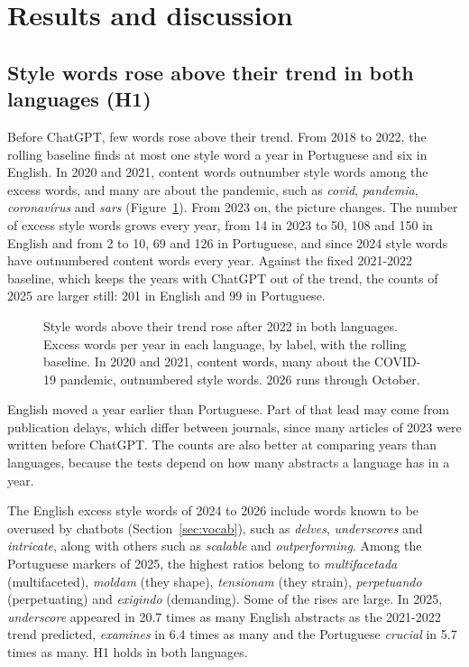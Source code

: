 \documentclass[12pt]{article}
\newcommand{\w}[1]{\textit{#1}}
\begin{document}
\section{Results and discussion}
\label{sec:results}

\subsection{Style words rose above their trend in both languages (H1)}
\label{sec:h1}

Before ChatGPT, few words rose above their trend. From 2018 to 2022, the rolling baseline finds at
most one style word a year in Portuguese and six in English. In 2020 and 2021, content words
outnumber style words among the excess words, and many are about the pandemic, such as \w{covid},
\w{pandemia}, \w{coronavírus} and \w{sars} (Figure~\ref{fig:excess}). From 2023 on, the picture
changes. The number of excess style words grows every year, from 14 in 2023 to 50, 108 and 150 in
English and from 2 to 10, 69 and 126 in Portuguese, and since 2024 style words have outnumbered
content words every year. Against the fixed 2021-2022 baseline, which keeps the years with ChatGPT
out of the trend, the counts of 2025 are larger still: 201 in English and 99 in Portuguese.

\begin{figure}[!htb]
  \centering
  
  \caption{Style words above their trend rose after 2022 in both languages. Excess words per year
    in each language, by label, with the rolling baseline. In 2020 and 2021, content words, many
    about the COVID-19 pandemic, outnumbered style words. 2026 runs through October.}
  \label{fig:excess}
\end{figure}

English moved a year earlier than Portuguese. Part of that lead may come from publication delays,
which differ between journals, since many articles of 2023 were written before ChatGPT. The counts
are also better at comparing years than languages, because the tests depend on how many abstracts a
language has in a year.

The English excess style words of 2024 to 2026 include words known to be overused by chatbots
(Section~\ref{sec:vocab}), such as \w{delves}, \w{underscores} and \w{intricate}, along with others
such as \w{scalable} and \w{outperforming}. Among the Portuguese markers of 2025, the highest ratios
belong to \w{multifacetada} (multifaceted), \w{moldam} (they shape), \w{tensionam} (they strain),
\w{perpetuando} (perpetuating) and \w{exigindo} (demanding). Some of the rises are large. In 2025,
\w{underscore} appeared in 20.7 times as many English abstracts as the 2021-2022 trend predicted,
\w{examines} in 6.4 times as many and the Portuguese \w{crucial} in 5.7 times as many. H1 holds in
both languages.
\end{document}
